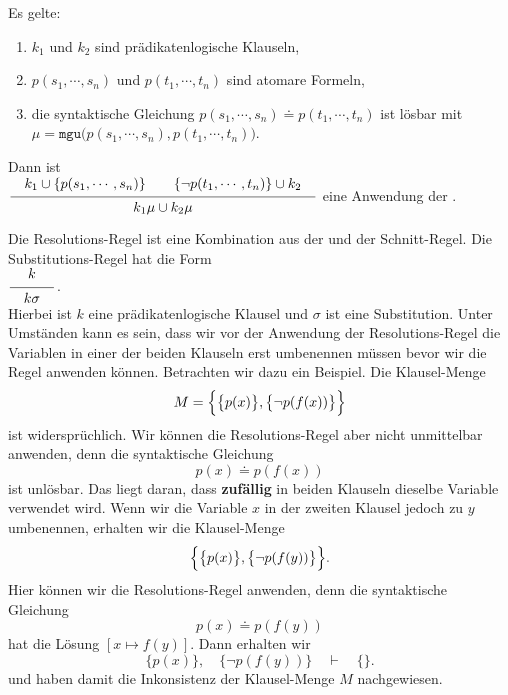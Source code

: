 \begin{Definition}  
    Es gelte:
    \begin{enumerate}
    \item $k_1$ und $k_2$ sind prädikatenlogische Klauseln,
    \item $p(s_1,\cdots,s_n)$ und $p(t_1,\cdots,t_n)$ sind atomare Formeln,
    \item die syntaktische Gleichung $p(s_1,\cdots,s_n)  \doteq p(t_1,\cdots,t_n)$ ist lösbar mit 
          \\[0.2cm]
          \hspace*{1.3cm}
          $\mu = \mathtt{mgu}\bigl(p(s_1,\cdots,s_n), p(t_1,\cdots,t_n)\bigr)$. 
    \end{enumerate}
     Dann ist 
     \\[0.2cm]
     \hspace*{1.3cm}
     $\schluss{k_1 \cup\{ p(s_1,\cdots,s_n)\} \quad\quad \{\neg p(t_1,\cdots,t_n)\} \cup k_2}{
                 k_1\mu \cup k_2\mu} 
     $
     eine Anwendung der .
     \eox
\end{Definition}
Die Resolutions-Regel ist eine Kombination aus der  und der 
Schnitt-Regel.  Die Substitutions-Regel  hat die Form
\\[0.2cm]
\hspace*{1.3cm}
$\schluss{k}{k\sigma}$. 
\\[0.2cm]
Hierbei ist $k$ eine prädikatenlogische Klausel und $\sigma$ ist eine Substitution.
Unter Umständen kann es sein, dass wir vor der Anwendung der Resolutions-Regel 
die Variablen in einer der beiden Klauseln erst umbenennen
müssen bevor wir die Regel anwenden können.  Betrachten wir dazu ein Beispiel.
Die Klausel-Menge 
\[ M = \Bigl\{ \bigl\{ p(x) \bigr\}, \bigl\{ \neg p(f(x)) \bigr\} \Bigr\} \]
ist widersprüchlich.  Wir können die Resolutions-Regel aber nicht unmittelbar anwenden,
denn die syntaktische Gleichung 
\[ p(x) \doteq p(f(x)) \]
ist unlösbar.  Das liegt daran, dass \textbf{zufällig} in beiden Klauseln dieselbe Variable
verwendet wird.  Wenn wir die Variable $x$ in der zweiten Klausel jedoch zu $y$ umbenennen, erhalten
wir die Klausel-Menge 
\[ \Bigl\{ \bigl\{ p(x) \bigr\}, \bigl\{ \neg p(f(y)) \bigr\} \Bigr\}. \]
Hier können wir die Resolutions-Regel anwenden, denn die syntaktische Gleichung 
\[ p(x) \doteq p(f(y)) \]
hat die Lösung $[x \mapsto f(y)]$.  Dann erhalten wir 
\[ \bigl\{ p(x) \bigr\}, \quad \bigl\{ \neg p(f(y)) \bigr\} \quad \vdash \quad \{\}. \]
und haben damit die Inkonsistenz der Klausel-Menge $M$ nachgewiesen.

